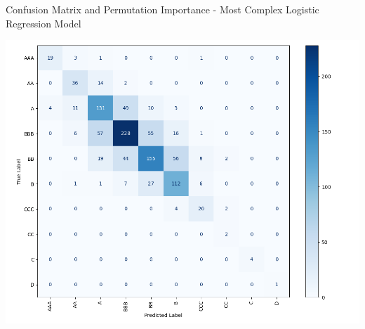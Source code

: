 \documentclass{article}[11pt]
\begin{document}
    \begin{table}[h!]
        \centering
        \caption{Confusion Matrix and Permutation Importance - Most Complex Logistic Regression Model}
        \begin{minipage}[c]{0.45\linewidth}
            \centering
            \includegraphics[width=0.95\hsize]{../Output/Modelling/Logistic Regression/exclude_previous_rating_model_3/exclude_previous_rating_model_3_confusion_matrix_no_title.png}
        \end{minipage}
        \begin{minipage}[c]{0.45\linewidth}
            \centering
            
        \end{minipage}
        \label{tab:logistic-most-complex-confusion-matrix-and-permutation-importance}
    \end{table}
\end{document}
